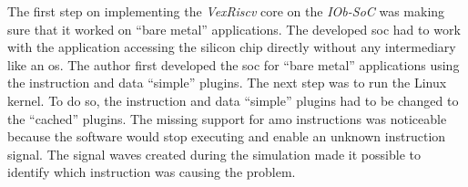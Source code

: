 The first step on implementing the \textit{VexRiscv} core on the \textit{IOb-SoC} was making sure that it worked on \enquote{bare metal} applications. The developed \acrshort{soc} had to work with the application accessing the silicon chip directly without any intermediary like an \acrfull{os}. The author first developed the \acrshort{soc} for \enquote{bare metal} applications using the instruction and data \enquote{simple} plugins. The next step was to run the Linux kernel. To do so, the instruction and data \enquote{simple} plugins had to be changed to the \enquote{cached} plugins. The missing support for \acrfull{amo} instructions was noticeable because the software would stop executing and enable an unknown instruction signal. The signal waves created during the simulation made it possible to identify which instruction was causing the problem.

